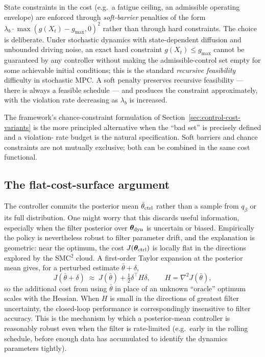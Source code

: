 State constraints in the cost (e.g.\ a fatigue ceiling, an admissible
operating envelope) are enforced through \emph{soft-barrier} penalties
of the form $\lambda_b \cdot \max(g(X_t) - g_{\max}, 0)^2$ rather than
through hard constraints. The choice is deliberate. Under stochastic
dynamics with state-dependent diffusion and unbounded driving noise,
an exact hard constraint $g(X_t) \le g_{\max}$ cannot be guaranteed
by any controller without making the admissible-control set empty for
some achievable initial conditions; this is the standard
\emph{recursive feasibility} difficulty in stochastic MPC. A soft
penalty preserves recursive feasibility --- there is always a
feasible schedule --- and produces the constraint approximately, with
the violation rate decreasing as $\lambda_b$ is increased.

The framework's chance-constraint formulation of
Section~\ref{sec:control-cost-variants} is the more principled
alternative when the ``bad set'' is precisely defined and a violation-
rate budget is the natural specification. Soft barriers and chance
constraints are not mutually exclusive; both can be combined in the
same cost functional.

\subsection{The flat-cost-surface argument} \label{sec:mpc-robustness}

The controller commits the posterior mean $\bar\theta_{\rm ctrl}$
rather than a sample from $q_\beta$ or its full distribution. One
might worry that this discards useful information, especially when
the filter posterior over $\bm{\theta}_{\rm dyn}$ is uncertain or biased.
Empirically the policy is nevertheless robust to filter parameter
drift, and the explanation is geometric: near the optimum, the cost
$J(\bm{\theta}_{\rm ctrl})$ is locally flat in the directions explored by the
SMC$^2$ cloud. A first-order Taylor expansion at the posterior mean
gives, for a perturbed estimate $\bar\theta + \delta$,
\begin{equation}
J(\bar\theta + \delta)
   \;\approx\; J(\bar\theta) + \tfrac{1}{2}\delta^\top H \delta,
   \qquad H = \nabla^2 J(\bar\theta),
\end{equation}
so the additional cost from using $\bar\theta$ in place of an unknown
``oracle'' optimum scales with the Hessian. When $H$ is small in the
directions of greatest filter uncertainty, the closed-loop performance
is correspondingly insensitive to filter accuracy. This is the
mechanism by which a posterior-mean controller is reasonably robust
even when the filter is rate-limited (e.g.\ early in the rolling
schedule, before enough data has accumulated to identify the dynamics
parameters tightly).
